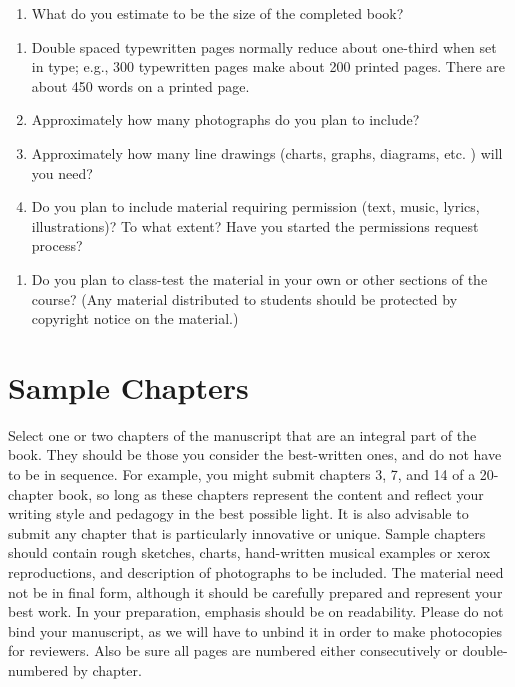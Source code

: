 \documentclass[
  10pt,
  dvipsnames,enabledeprecatedfontcommands]{scrartcl}
\providecommand{\tightlist}{%
  \setlength{\itemsep}{0pt}\setlength{\parskip}{0pt}}
\begin{document}
\begin{enumerate}
\def\labelenumi{\arabic{enumi}.}
\setcounter{enumi}{1}
\tightlist
\item
  What do you estimate to be the size of the completed book?
\end{enumerate}

\begin{enumerate}
\def\labelenumi{\alph{enumi}.}
\item
  Double spaced typewritten pages normally reduce about one-third when
  set in type; e.g., 300 typewritten pages make about 200 printed pages.
  There are about 450 words on a printed page.
\item
  Approximately how many photographs do you plan to include?
\item
  Approximately how many line drawings (charts, graphs, diagrams, etc. )
  will you need?
\item
  Do you plan to include material requiring permission (text, music,
  lyrics, illustrations)? To what extent? Have you started the
  permissions request process?
\end{enumerate}

\begin{enumerate}
\def\labelenumi{\arabic{enumi}.}
\setcounter{enumi}{2}
\tightlist
\item
  Do you plan to class-test the material in your own or other sections
  of the course? (Any material distributed to students should be
  protected by copyright notice on the material.)
\end{enumerate}

\hypertarget{sample-chapters}{%
\section{Sample Chapters}\label{sample-chapters}}

Select one or two chapters of the manuscript that are an integral part
of the book. They should be those you consider the best-written ones,
and do not have to be in sequence. For example, you might submit
chapters 3, 7, and 14 of a 20-chapter book, so long as these chapters
represent the content and reflect your writing style and pedagogy in the
best possible light. It is also advisable to submit any chapter that is
particularly innovative or unique. Sample chapters should contain rough
sketches, charts, hand-written musical examples or xerox reproductions,
and description of photographs to be included. The material need not be
in final form, although it should be carefully prepared and represent
your best work. In your preparation, emphasis should be on readability.
Please do not bind your manuscript, as we will have to unbind it in
order to make photocopies for reviewers. Also be sure all pages are
numbered either consecutively or double-numbered by chapter.
\end{document}
